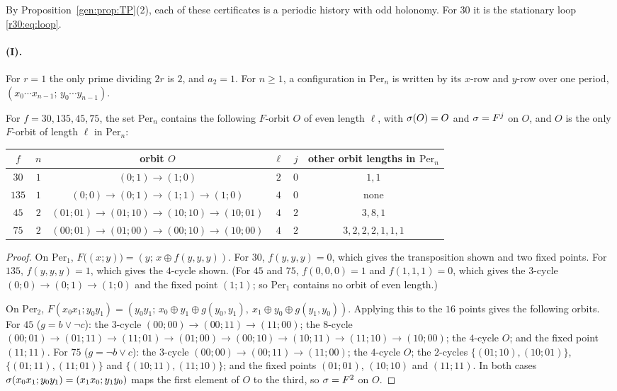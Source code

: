 By Proposition~\ref{gen:prop:TP}(2), each of these certificates is a periodic history with odd holonomy. For $30$ it is the stationary loop \eqref{r30:eq:loop}.

\paragraph{\textup{(I)}.} For $r=1$ the only prime dividing $2r$ is $2$, and $a_2=1$. For $n\ge1$, a configuration in $\mathrm{Per}_n$ is written by its $x$-row and $y$-row over one period, $(x_0\cdots x_{n-1};\,y_0\cdots y_{n-1})$.

\begin{lemma}\label{pm:lem:Pinst}
For $f=30,135,45,75$, the set $\mathrm{Per}_n$ contains the following $F$-orbit $O$ of even length $\ell$, with $\sigma(O)=O$ and $\sigma=F^j$ on $O$, and $O$ is the only $F$-orbit of length $\ell$ in $\mathrm{Per}_n$:
\begin{center}
\begin{tabular}{cccccc}
\toprule
$f$ & $n$ & orbit $O$ & $\ell$ & $j$ & other orbit lengths in $\mathrm{Per}_n$\\
\midrule
$30$ & $1$ & $(0;1)\to(1;0)$ & $2$ & $0$ & $1,1$\\
$135$ & $1$ & $(0;0)\to(0;1)\to(1;1)\to(1;0)$ & $4$ & $0$ & none\\
$45$ & $2$ & $(01;01)\to(01;10)\to(10;10)\to(10;01)$ & $4$ & $2$ & $3,8,1$\\
$75$ & $2$ & $(00;01)\to(01;00)\to(00;10)\to(10;00)$ & $4$ & $2$ & $3,2,2,2,1,1,1$\\
\bottomrule
\end{tabular}
\end{center}
\end{lemma}

\begin{proof}
On $\mathrm{Per}_1$, $F\bigl((x;y)\bigr)=(y;\,x\oplus f(y,y,y))$. For $30$, $f(y,y,y)=0$, which gives the transposition shown and two fixed points. For $135$, $f(y,y,y)=1$, which gives the $4$-cycle shown. (For $45$ and $75$, $f(0,0,0)=1$ and $f(1,1,1)=0$, which gives the $3$-cycle $(0;0)\to(0;1)\to(1;0)$ and the fixed point $(1;1)$; so $\mathrm{Per}_1$ contains no orbit of even length.)

On $\mathrm{Per}_2$, $F(x_0x_1;y_0y_1)=(y_0y_1;\,x_0\oplus y_1\oplus g(y_0,y_1),\ x_1\oplus y_0\oplus g(y_1,y_0))$. Applying this to the $16$ points gives the following orbits. For $45$ ($g=b\vee\neg c$): the $3$-cycle $(00;00)\to(00;11)\to(11;00)$; the $8$-cycle $(00;01)\to(01;11)\to(11;01)\to(01;00)\to(00;10)\to(10;11)\to(11;10)\to(10;00)$; the $4$-cycle $O$; and the fixed point $(11;11)$. For $75$ ($g=\neg b\vee c$): the $3$-cycle $(00;00)\to(00;11)\to(11;00)$; the $4$-cycle $O$; the $2$-cycles $\{(01;10),(10;01)\}$, $\{(01;11),(11;01)\}$ and $\{(10;11),(11;10)\}$; and the fixed points $(01;01)$, $(10;10)$ and $(11;11)$. In both cases $\sigma(x_0x_1;y_0y_1)=(x_1x_0;y_1y_0)$ maps the first element of $O$ to the third, so $\sigma=F^2$ on $O$.
\end{proof}

